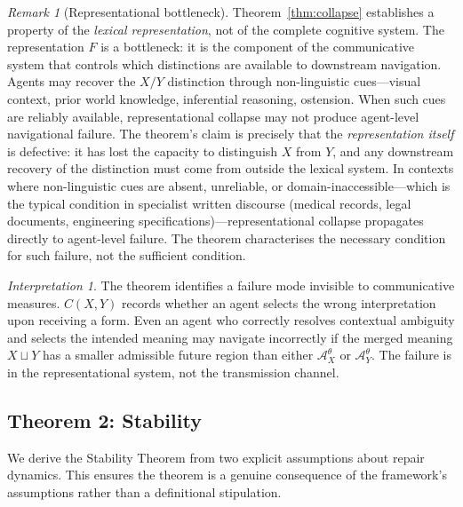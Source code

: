\documentclass[12pt]{article}
\theoremstyle{rthm}
\theoremstyle{rdef}
\theoremstyle{remark}
\newtheorem*{remark}{Remark}
\newtheorem*{interpretation}{Interpretation}
\newcommand{\A}{\mathcal{A}}
\begin{document}
\begin{remark}[Representational bottleneck]
\label{rem:scope}
Theorem~\ref{thm:collapse} establishes a property of the \emph{lexical
representation}, not of the complete cognitive system. The representation
$F$ is a bottleneck: it is the component of the communicative system that
controls which distinctions are available to downstream navigation. Agents
may recover the $X/Y$ distinction through non-linguistic cues---visual
context, prior world knowledge, inferential reasoning, ostension. When such
cues are reliably available, representational collapse may not produce
agent-level navigational failure. The theorem's claim is precisely that the
\emph{representation itself} is defective: it has lost the capacity to
distinguish $X$ from $Y$, and any downstream recovery of the distinction
must come from outside the lexical system. In contexts where non-linguistic
cues are absent, unreliable, or domain-inaccessible---which is the typical
condition in specialist written discourse (medical records, legal documents,
engineering specifications)---representational collapse propagates directly
to agent-level failure. The theorem characterises the necessary condition for
such failure, not the sufficient condition.
\end{remark}

\begin{interpretation}
The theorem identifies a failure mode invisible to communicative measures.
$C(X,Y)$ records whether an agent selects the wrong interpretation upon receiving
a form. Even an agent who correctly resolves contextual ambiguity and selects the
intended meaning may navigate incorrectly if the merged meaning $X \sqcup Y$ has
a smaller admissible future region than either $\A_X^{\theta}$ or
$\A_Y^{\theta}$. The failure is in the representational system, not the
transmission channel.
\end{interpretation}

\subsection{Theorem 2: Stability}
\label{subsec:t2}

We derive the Stability Theorem from two explicit assumptions about repair
dynamics. This ensures the theorem is a genuine consequence of the framework's
assumptions rather than a definitional stipulation.
\end{document}

